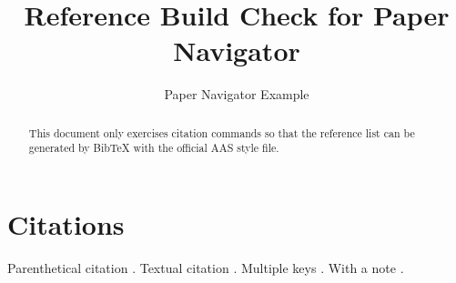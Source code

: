 \documentclass{aastex701}
\begin{document}
\title{Reference Build Check for Paper Navigator}

\author{Paper Navigator Example}

\begin{abstract}
This document only exercises citation commands so that the reference list can be
generated by BibTeX with the official AAS style file.
\end{abstract}

\section{Citations}
Parenthetical citation \citep{astropycollaboration2013}. Textual citation
\citet{corrales2015}. Multiple keys \citep{bertin1996,cloutier2018}.
With a note \citep[see][Section~2]{lamport1994}.

{}

\end{document}
